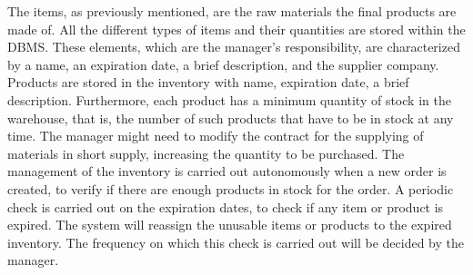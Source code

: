 The items, as previously mentioned, are the raw materials the final products are made of. All the different types of items and their quantities are stored within the DBMS. These elements, which are the manager's responsibility, are characterized by a name, an expiration date, a brief description, and the supplier company. Products are stored in the inventory with name, expiration date, a brief description. Furthermore, each product has a minimum quantity of stock in the warehouse, that is, the number of such products that have to be in stock at any time. The manager might need to modify the contract for the supplying of materials in short supply, increasing the quantity to be purchased. The management of the inventory is carried out autonomously when a new order is created, to verify if there are enough products in stock for the order. A periodic check is carried out on the expiration dates, to check if any item or product is expired. The system will reassign the unusable items or products to the expired inventory. The frequency on which this check is carried out will be decided by the manager.
%
%
%

